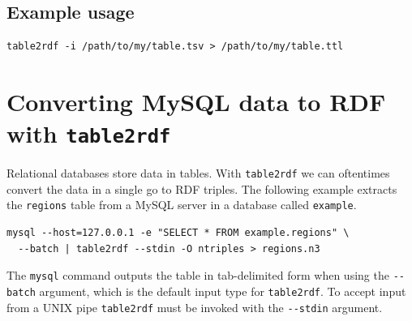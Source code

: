\documentclass[11pt,a4paper,oneside]{book}
\begin{document}
\subsection{Example usage}

\begin{siderules}
\begin{verbatim}
table2rdf -i /path/to/my/table.tsv > /path/to/my/table.ttl
\end{verbatim}
\end{siderules}

\section{Converting MySQL data to RDF with \texttt{table2rdf}}

  Relational databases store data in tables.  With \texttt{table2rdf} we
  can oftentimes convert the data in a single go to RDF triples.  The following
  example extracts the \texttt{regions} table from a MySQL server in a database
  called \texttt{example}.

\begin{siderules}
\begin{verbatim}
mysql --host=127.0.0.1 -e "SELECT * FROM example.regions" \
  --batch | table2rdf --stdin -O ntriples > regions.n3
\end{verbatim}
\end{siderules}

  The \texttt{mysql} command outputs the table in tab-delimited form when using
  the \texttt{-{}-batch} argument, which is the default input type for
  \texttt{table2rdf}.  To accept input from a UNIX pipe \texttt{table2rdf} must
  be invoked with the \texttt{-{}-stdin} argument.



\end{document}
